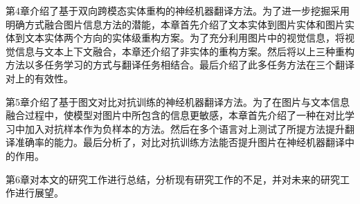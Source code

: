 第4章介绍了基于双向跨模态实体重构的神经机器翻译方法。为了进一步挖掘采用明确方式融合图片信息方法的潜能，本章首先介绍了文本实体到图片实体和图片实体到文本实体两个方向的实体级重构方案。为了充分利用图片中的视觉信息，将视觉信息与文本上下文融合，本章还介绍了非实体的重构方案。然后将以上三种重构方法以多任务学习的方式与翻译任务相结合。最后介绍了此多任务方法在三个翻译对上的有效性。

第5章介绍了基于图文对比对抗训练的神经机器翻译方法。为了在图片与文本信息融合过程中，使模型对图片中所包含的信息更敏感，本章首先介绍了一种在对比学习中加入对抗样本作为负样本的方法。然后在多个语言对上测试了所提方法提升翻译准确率的能力。最后分析了，对比对抗训练方法能否提升图片在神经机器翻译中的作用。

第6章对本文的研究工作进行总结，分析现有研究工作的不足，并对未来的研究工作进行展望。
